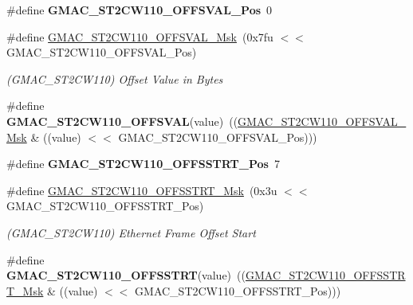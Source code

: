 \begin{DoxyCompactItemize}
\item 
\mbox{\label{group__SAME70__GMAC_gad0497d4daf57710a4d901ba0c3ce29e2}} 
\#define {\bfseries G\+M\+A\+C\+\_\+\+S\+T2\+C\+W110\+\_\+\+O\+F\+F\+S\+V\+A\+L\+\_\+\+Pos}~0
\item 
\mbox{\label{group__SAME70__GMAC_ga4e4798bf1c6d7bf2e4c126bbc58dd942}} 
\#define \mbox{\hyperlink{group__SAME70__GMAC_ga4e4798bf1c6d7bf2e4c126bbc58dd942}{G\+M\+A\+C\+\_\+\+S\+T2\+C\+W110\+\_\+\+O\+F\+F\+S\+V\+A\+L\+\_\+\+Msk}}~(0x7fu $<$$<$ G\+M\+A\+C\+\_\+\+S\+T2\+C\+W110\+\_\+\+O\+F\+F\+S\+V\+A\+L\+\_\+\+Pos)
\begin{DoxyCompactList}\small\item\em (G\+M\+A\+C\+\_\+\+S\+T2\+C\+W110) Offset Value in Bytes \end{DoxyCompactList}\item 
\mbox{\label{group__SAME70__GMAC_ga0fb76e9748e4a57a251267655017f3fc}} 
\#define {\bfseries G\+M\+A\+C\+\_\+\+S\+T2\+C\+W110\+\_\+\+O\+F\+F\+S\+V\+AL}(value)~((\mbox{\hyperlink{group__SAMV71__GMAC_ga4e4798bf1c6d7bf2e4c126bbc58dd942}{G\+M\+A\+C\+\_\+\+S\+T2\+C\+W110\+\_\+\+O\+F\+F\+S\+V\+A\+L\+\_\+\+Msk}} \& ((value) $<$$<$ G\+M\+A\+C\+\_\+\+S\+T2\+C\+W110\+\_\+\+O\+F\+F\+S\+V\+A\+L\+\_\+\+Pos)))
\item 
\mbox{\label{group__SAME70__GMAC_ga1fcd0f409d053ae1ae513e3f69c5aafc}} 
\#define {\bfseries G\+M\+A\+C\+\_\+\+S\+T2\+C\+W110\+\_\+\+O\+F\+F\+S\+S\+T\+R\+T\+\_\+\+Pos}~7
\item 
\mbox{\label{group__SAME70__GMAC_ga56bc4b2fdaf040360d2e104b1b2970b0}} 
\#define \mbox{\hyperlink{group__SAME70__GMAC_ga56bc4b2fdaf040360d2e104b1b2970b0}{G\+M\+A\+C\+\_\+\+S\+T2\+C\+W110\+\_\+\+O\+F\+F\+S\+S\+T\+R\+T\+\_\+\+Msk}}~(0x3u $<$$<$ G\+M\+A\+C\+\_\+\+S\+T2\+C\+W110\+\_\+\+O\+F\+F\+S\+S\+T\+R\+T\+\_\+\+Pos)
\begin{DoxyCompactList}\small\item\em (G\+M\+A\+C\+\_\+\+S\+T2\+C\+W110) Ethernet Frame Offset Start \end{DoxyCompactList}\item 
\mbox{\label{group__SAME70__GMAC_gaabfd0899f29162f9417c033b3b64047a}} 
\#define {\bfseries G\+M\+A\+C\+\_\+\+S\+T2\+C\+W110\+\_\+\+O\+F\+F\+S\+S\+T\+RT}(value)~((\mbox{\hyperlink{group__SAMV71__GMAC_ga56bc4b2fdaf040360d2e104b1b2970b0}{G\+M\+A\+C\+\_\+\+S\+T2\+C\+W110\+\_\+\+O\+F\+F\+S\+S\+T\+R\+T\+\_\+\+Msk}} \& ((value) $<$$<$ G\+M\+A\+C\+\_\+\+S\+T2\+C\+W110\+\_\+\+O\+F\+F\+S\+S\+T\+R\+T\+\_\+\+Pos)))

\end{DoxyCompactItemize}
